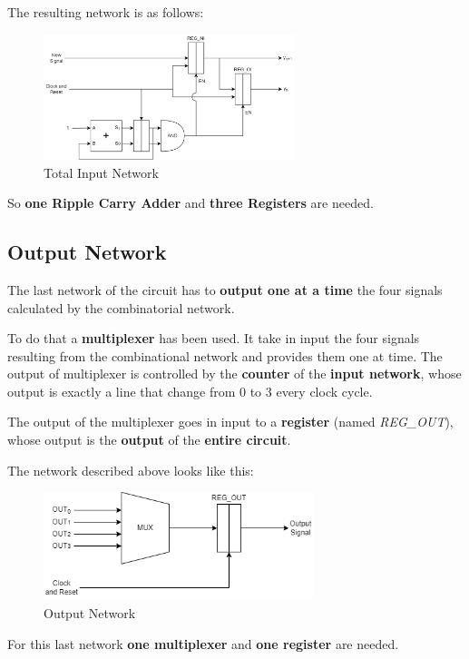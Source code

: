 The resulting network is as follows:

\begin{figure}[H]
    \centering
    \includegraphics[width=0.65\textwidth]{img/Chapter2/InputNetwork2.png}
    \caption{Total Input Network}
    \label{fig:InputNetwork2}
\end{figure}

So \textbf{one Ripple Carry Adder} and \textbf{three Registers} are needed.

\subsection{Output Network}

The last network of the circuit has to \textbf{output one at a time} the four signals calculated by the combinatorial network. 

To do that a \textbf{multiplexer} has been used. It take in input the four signals resulting from the combinational network and provides them one at time. The output of multiplexer is controlled by the \textbf{counter} of the \textbf{input network}, whose output is exactly a line that change from 0 to 3 every clock cycle.

The output of the multiplexer goes in input to a \textbf{register} (named \textit{REG\_OUT}), whose output is the \textbf{output} of the \textbf{entire circuit}.

The network described above looks like this:

\begin{figure}[H]
    \centering
    \includegraphics[width=0.7\textwidth]{img/Chapter2/OutputNetwork.png}
    \caption{Output Network}
    \label{fig:OutputNetwork}
\end{figure}

For this last network \textbf{one multiplexer} and \textbf{one register} are needed.